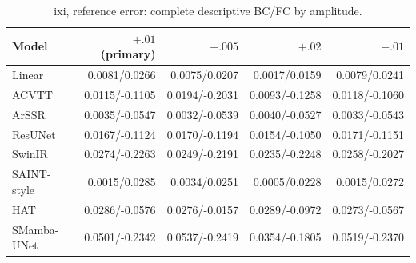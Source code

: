 \begin{table}[t]\centering\scriptsize

\caption{ixi, reference error: complete descriptive BC/FC by amplitude.}

\begin{tabular}{lrrrr}\toprule Model & $+.01$ (primary) & $+.005$ & $+.02$ & $-.01$\\\midrule

Linear & 0.0081/0.0266 & 0.0075/0.0207 & 0.0017/0.0159 & 0.0079/0.0241\\

ACVTT & 0.0115/-0.1105 & 0.0194/-0.2031 & 0.0093/-0.1258 & 0.0118/-0.1060\\

ArSSR & 0.0035/-0.0547 & 0.0032/-0.0539 & 0.0040/-0.0527 & 0.0033/-0.0543\\

ResUNet & 0.0167/-0.1124 & 0.0170/-0.1194 & 0.0154/-0.1050 & 0.0171/-0.1151\\

SwinIR & 0.0274/-0.2263 & 0.0249/-0.2191 & 0.0235/-0.2248 & 0.0258/-0.2027\\

SAINT-style & 0.0015/0.0285 & 0.0034/0.0251 & 0.0005/0.0228 & 0.0015/0.0272\\

HAT & 0.0286/-0.0576 & 0.0276/-0.0157 & 0.0289/-0.0972 & 0.0273/-0.0567\\

SMamba-UNet & 0.0501/-0.2342 & 0.0537/-0.2419 & 0.0354/-0.1805 & 0.0519/-0.2370\\

\bottomrule\end{tabular}\end{table}

